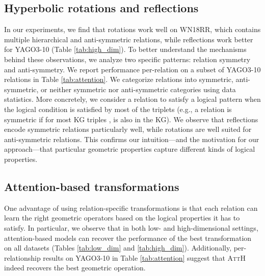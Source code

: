 \documentclass[11pt,a4paper]{article}
\newcommand{\model}[1]{\textsc{AttH}}
\begin{document}
 \subsection{Hyperbolic rotations and reflections} \label{sec:expops}
In our experiments, we find that rotations work well on WN18RR, which contains multiple hierarchical and anti-symmetric relations, while reflections work better for YAGO3-10 (Table \ref{tab:high_dim}). 
To better understand the mechanisms behind these observations, we analyze two specific patterns: relation symmetry and anti-symmetry.  
We report performance per-relation on a subset of YAGO3-10 relations in Table \ref{tab:attention}. 
We categorize relations into symmetric, anti-symmetric, or neither symmetric nor anti-symmetric categories using data statistics.
More concretely, we consider a relation to satisfy a logical pattern when the logical condition is satisfied by most of the triplets (e.g., a relation  is symmetric if for most KG triples ,  is also in the KG). 
We observe that reflections encode symmetric relations particularly well, while rotations are well suited for anti-symmetric relations.  
This confirms our intuition---and the motivation for our approach---that particular geometric properties capture different kinds of logical properties. 
\subsection{Attention-based transformations} \label{sec:expatt}
One advantage of using relation-specific transformations is that each relation can learn the right geometric operators based on the logical properties it has to satisfy.  
In particular, we observe that in both low- and high-dimensional settings, attention-based models can recover the performance of the best transformation on all datasets (Tables \ref{tab:low_dim} and \ref{tab:high_dim}). 
Additionally, per-relationship results on YAGO3-10 in Table \ref{tab:attention} suggest that \model{} indeed recovers the best geometric operation. 
\end{document}
